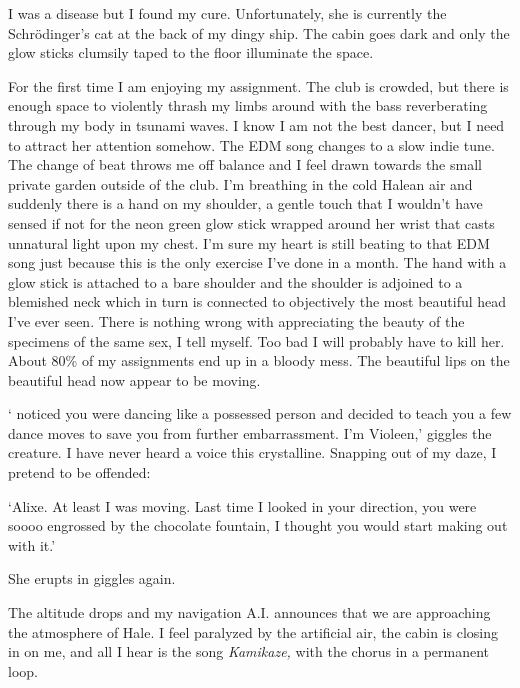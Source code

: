 \hsep

I was a disease but I found my cure. Unfortunately, she is currently
the Schrödinger's cat at the back of my dingy ship. The cabin goes
dark and only the glow sticks clumsily taped to the floor illuminate
the space.

\hsep

\begin{flashback}
For the first time I am enjoying my assignment. The club is crowded,
but there is enough space to violently thrash my limbs around with the
bass reverberating through my body in tsunami waves. I know I am not
the best dancer, but I need to attract her attention somehow. The EDM
song changes to a slow indie tune. The change of beat throws me off
balance and I feel drawn towards the small private garden outside of
the club. I'm breathing in the cold Halean air and suddenly there is a
hand on my shoulder, a gentle touch that I wouldn't have sensed if not
for the neon green glow stick wrapped around her wrist that casts
unnatural light upon my chest. I'm sure my heart is still beating to
that EDM song just because this is the only exercise I've done in a
month. The hand with a glow stick is attached to a bare shoulder and
the shoulder is adjoined to a blemished neck which in turn is
connected to objectively the most beautiful head I've ever seen. There
is nothing wrong with appreciating the beauty of the specimens of the
same sex, I tell myself. Too bad I will probably have to kill
her. About 80\% of my assignments end up in a bloody mess. The
beautiful lips on the beautiful head now appear to be
moving.

`\textellipsis{} noticed you were dancing like a possessed person and
decided to teach you a few dance moves to save you from further
embarrassment. I'm Violeen,' giggles the creature. I have never heard
a voice this crystalline. Snapping out of my daze, I pretend to be
offended:

`Alixe. At least I was moving. Last time I looked in your direction,
you were soooo engrossed by the chocolate fountain, I thought you
would start making out with it.'

She erupts in giggles again.
\end{flashback}

\hsep

The altitude drops and my navigation A.I. announces that we are
approaching the atmosphere of Hale. I feel paralyzed by the artificial
air, the cabin is closing in on me, and all I hear is the song
\textit{Kamikaze,} with the chorus in a permanent loop.

